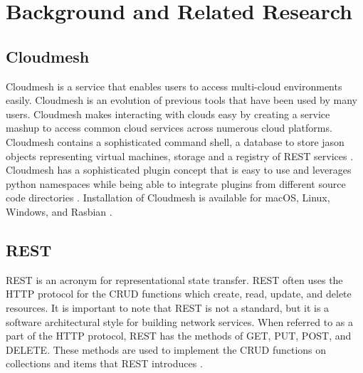 
\section{Background and Related
Research}\label{background-and-related-research}

\subsection{Cloudmesh}\label{cloudmesh}


Cloudmesh \cite{cloudmesh-manual} is a service that enables users to
access multi-cloud environments easily. Cloudmesh is an evolution of
previous tools that have been used by many users. Cloudmesh makes
interacting with clouds easy by creating a service mashup to access
common cloud services across numerous cloud platforms. Cloudmesh
contains a sophisticated command shell, a database to store jason
objects representing virtual machines, storage and a registry of REST
services \cite{cloudmesh-openapi}.  Cloudmesh has a sophisticated
plugin concept that is easy to use and leverages python namespaces
while being able to integrate plugins from different source code
directories \cite{cloudmesh-github}.  Installation of Cloudmesh is
available for macOS, Linux, Windows, and Rasbian
\cite{cloudmesh-manual}.


\subsection{REST}\label{rest}

REST is an acronym for representational state transfer. REST often uses
the HTTP protocol for the CRUD functions which create, read, update, and
delete resources. It is important to note that REST is not a standard,
but it is a software architectural style for building network services.
When referred to as a part of the HTTP protocol, REST has the methods of
GET, PUT, POST, and DELETE. These methods are used to implement the CRUD
functions on collections and items that REST introduces
\cite{las-book-cloud}.
 
